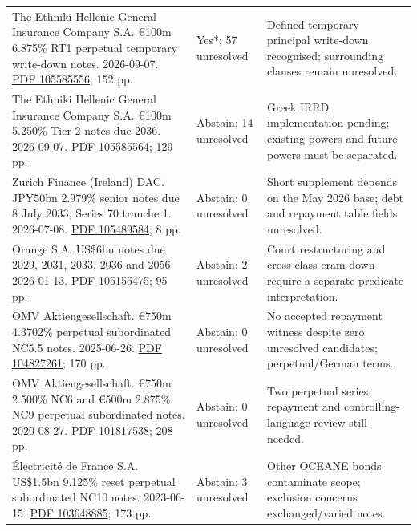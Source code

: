 \documentclass[12pt,a4paper,oneside,openany]{book}
\begin{document}
{\begin{longtable}{P{0.44\textwidth}P{0.12\textwidth}P{0.34\textwidth}}
The Ethniki Hellenic General Insurance Company S.A. €100m 6.875\% RT1 perpetual temporary write-down notes. 2026-09-07. \href{../prospectus/difficulty-2026-10-04/pdfs/case-105585556.pdf}{PDF 105585556}; 152 pp. & Yes*; 57 unresolved & Defined temporary principal write-down recognised; surrounding clauses remain unresolved. \\

The Ethniki Hellenic General Insurance Company S.A. €100m 5.250\% Tier 2 notes due 2036. 2026-09-07. \href{../prospectus/difficulty-2026-10-04/pdfs/case-105585564.pdf}{PDF 105585564}; 129 pp. & Abstain; 14 unresolved & Greek IRRD implementation pending; existing powers and future powers must be separated. \\

Zurich Finance (Ireland) DAC. JPY50bn 2.979\% senior notes due 8 July 2033, Series 70 tranche 1. 2026-07-08. \href{../prospectus/difficulty-2026-10-04/pdfs/case-105489584.pdf}{PDF 105489584}; 8 pp. & Abstain; 0 unresolved & Short supplement depends on the May 2026 base; debt and repayment table fields unresolved. \\

Orange S.A. US\$6bn notes due 2029, 2031, 2033, 2036 and 2056. 2026-01-13. \href{../prospectus/difficulty-2026-10-04/pdfs/case-105155475.pdf}{PDF 105155475}; 95 pp. & Abstain; 2 unresolved & Court restructuring and cross-class cram-down require a separate predicate interpretation. \\

OMV Aktiengesellschaft. €750m 4.3702\% perpetual subordinated NC5.5 notes. 2025-06-26. \href{../prospectus/difficulty-2026-10-04/pdfs/case-104827261.pdf}{PDF 104827261}; 170 pp. & Abstain; 0 unresolved & No accepted repayment witness despite zero unresolved candidates; perpetual/German terms. \\

OMV Aktiengesellschaft. €750m 2.500\% NC6 and €500m 2.875\% NC9 perpetual subordinated notes. 2020-08-27. \href{../prospectus/difficulty-2026-10-04/pdfs/case-101817538.pdf}{PDF 101817538}; 208 pp. & Abstain; 0 unresolved & Two perpetual series; repayment and controlling-language review still needed. \\

Électricité de France S.A. US\$1.5bn 9.125\% reset perpetual subordinated NC10 notes. 2023-06-15. \href{../prospectus/difficulty-2026-10-04/pdfs/case-103648885.pdf}{PDF 103648885}; 173 pp. & Abstain; 3 unresolved & Other OCEANE bonds contaminate scope; exclusion concerns exchanged/varied notes. \\


\end{longtable}}
\end{document}

